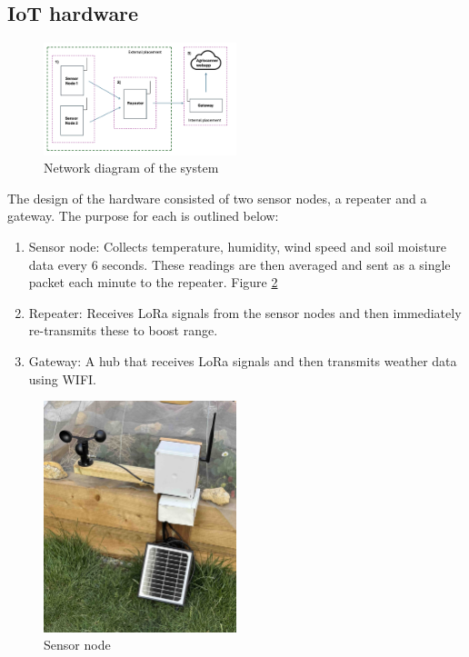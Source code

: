 \documentclass[conference]{IEEEtran}
\begin{document}
\subsection{IoT hardware}

\begin{figure}[htbp]
\centerline{\includegraphics[width=0.5\textwidth]{figures/network-diagram.png}}
\caption{Network diagram of the system}
\label{fig}
\end{figure}

The design of the hardware consisted of two sensor nodes, a repeater and a
gateway. The purpose for each is outlined below:

\begin{enumerate}
    \item Sensor node: Collects temperature, humidity, wind speed and soil
    moisture data every 6 seconds. These readings are then averaged and sent as
    a single packet each minute to the repeater. Figure \ref{sensor-node}
    \item Repeater: Receives LoRa signals from the sensor nodes and then
    immediately re-transmits these to boost range. 
    \item Gateway: A hub that receives LoRa signals and then transmits weather
    data using WIFI.
\end{enumerate}

\begin{figure}[htbp]
\centerline{\includegraphics[width=0.5\textwidth]{figures/node.jpg}}
\caption{Sensor node}
\label{sensor-node}
\end{figure}
\end{document}
